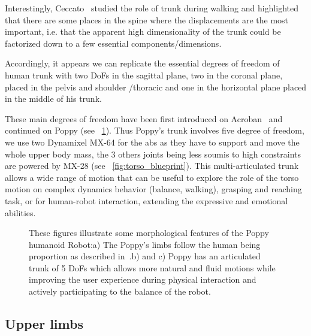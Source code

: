 Interestingly, Ceccato~\cite{ceccatoPlos09} studied the role of trunk during walking and highlighted that there are some places in the spine where the displacements are the most important, i.e. that the apparent high dimensionality of the trunk could be factorized down to a few essential components/dimensions.

Accordingly, it appears we can replicate the essential degrees of freedom of human trunk with two DoFs in the sagittal plane, two in the coronal plane, placed in the pelvis and shoulder /thoracic and one in the horizontal plane placed in the middle of his trunk.

These main degrees of freedom have been first introduced on Acroban~\cite{Ly2011bio} and continued on Poppy (see \figurename~\ref{fig:poppy_torso}).
Thus Poppy's trunk involves five degree of freedom, we use two Dynamixel MX-64 for the abs as they have to support and move the whole upper body mass, the 3 others joints being less soumis to high constraints are powered by MX-28 (see \figurename~\ref{fig:torso_blueprint}). This multi-articulated trunk allows a wide range of motion that can be useful to explore the role of the torso motion on complex dynamics behavior (balance, walking), grasping and reaching task, or for human-robot interaction, extending the expressive and emotional abilities.

\begin{figure}[p]
\centering


    \hfil
    \caption{These figures illustrate some morphological features of the Poppy humanoid Robot:\newline a) The Poppy's limbs follow the human being proportion as described in~\cite{dufour2005biomecanique}.\newline b) and c) Poppy has an articulated trunk of 5 DoFs which allows more natural and fluid motions while improving the user experience during physical interaction and actively participating to the balance of the robot.}
    \label{fig:poppy_torso}
\end{figure}



\subsection{Upper limbs} %

